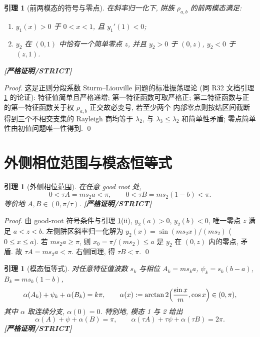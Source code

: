 \documentclass[UTF8]{ctexart}
\newtheorem{lemma}[theorem]{引理}
\newcommand{\STRICT}{\textbf{[严格证明/STRICT]}}
\begin{document}
\begin{lemma}[前两模态的符号与零点]\label{lem:modes}
	在斜率归一化下, 阱族 $\rho_{a,b}$ 的前两模态满足:
	\begin{enumerate}
		\item[(i)] $y_1(x)>0$ 于 $0<x<1$, 且 $y_1'(1)<0$;
		\item[(ii)] $y_2$ 在 $(0,1)$ 中恰有一个简单零点 $z$, 并且
			$y_2>0$ 于 $(0,z)$, $y_2<0$ 于 $(z,1)$.
	\end{enumerate}
	\STRICT{}
\end{lemma}

\begin{proof}
	这是正则分段系数 Sturm--Liouville 问题的标准振荡理论 (同 R32 文档引理
	\ref*{lem:modes} 的论证): 特征值简单且严格递增; 第一特征函数可取严格正;
	第二特征函数与正的第一特征函数关于权 $\rho_{a,b}$ 正交故必变号, 若至少两个
	内部零点则按结区间截断得到三个不相交支集的 Rayleigh 商均等于 $\lambda_2$,
	与 $\lambda_3\le\lambda_2$ 和简单性矛盾; 零点简单性由初值问题唯一性得到.
	\qed
\end{proof}

\section{外侧相位范围与模态恒等式}\label{sec:phases}

\begin{lemma}[外侧相位范围]\label{lem:phases}
	在任意 good root 处,
	\begin{equation}
		0<\tau A=ms_2a<\pi,\qquad 0<\tau B=ms_2(1-b)<\pi.
		\label{eq:phasesrange}
	\end{equation}
	等价地 $A,B\in(0,\pi/\tau)$. \STRICT{}
\end{lemma}

\begin{proof}
	由 good-root 符号条件与引理 \ref{lem:modes}(ii), $y_2(a)>0$, $y_2(b)<0$, 唯一零点
	$z$ 满足 $a<z<b$. 左侧阱区斜率归一化解为 $y_2(x)=\sin(ms_2x)/(ms_2)$
	($0\le x\le a$). 若 $ms_2a\ge\pi$, 则 $x_0=\pi/(ms_2)\le a$ 是 $y_2$ 在 $(0,z)$
	内的零点, 矛盾. 故 $\tau A=ms_2a<\pi$. 右侧同理, 得 $\tau B<\pi$. \qed
\end{proof}

\begin{lemma}[模态恒等式]\label{lem:modal}
	对任意特征值波数 $s_k$ 与相位 $A_k=ms_ka$, $\psi_k=s_k(b-a)$, $B_k=ms_k(1-b)$,
	\begin{equation}
		\alpha(A_k)+\psi_k+\alpha(B_k)=k\pi,
		\qquad \alpha(x):=\arctan2\Bigl(\frac{\sin x}{m},\cos x\Bigr)\in(0,\pi),
		\label{eq:modal}
	\end{equation}
	其中 $\alpha$ 取连续分支, $\alpha(0)=0$. 特别地, 模态 1 与 2 给出
	\begin{equation}
		\alpha(A)+\psi+\alpha(B)=\pi,\qquad
		\alpha(\tau A)+\tau\psi+\alpha(\tau B)=2\pi.
		\label{eq:modal12}
	\end{equation}
	\STRICT{}
\end{lemma}
\end{document}
